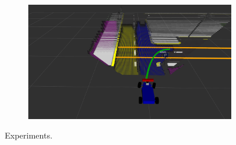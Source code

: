 \begin{figure}[h]
\begin{subfigure}[b]{0.45\linewidth}
  \end{subfigure}
  \begin{subfigure}[b]{0.45\linewidth}
      \includegraphics[width=\linewidth]{figures/experiments/parking-pc.png}
  \end{subfigure}
  \caption{Experiments.}
  \label{figure:sharp-turns}
\end{figure}

